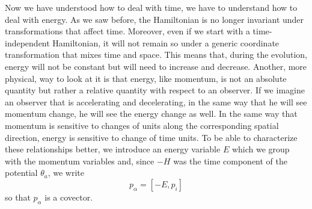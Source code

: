 Now we have understood how to deal with time, we have to understand how to deal with energy. As we saw before, the Hamiltonian is no longer invariant under transformations that affect time. Moreover, even if we start with a time-independent Hamiltonian, it will not remain so under a generic coordinate transformation that mixes time and space. This means that, during the evolution, energy will not be constant but will need to increase and decrease. Another, more physical, way to look at it is that energy, like momentum, is not an absolute quantity but rather a relative quantity with respect to an observer. If we imagine an observer that is accelerating and decelerating, in the same way that he will see momentum change, he will see the energy change as well. In the same way that momentum is sensitive to changes of units along the corresponding spatial direction, energy is sensitive to change of time units. To be able to characterize these relationships better, we introduce an energy variable $E$ which we group with the momentum variables and, since $-H$ was the time component of the potential $\theta_a$, we write
\begin{equation}
	p_\alpha = [-E, p_i]
\end{equation}
so that $p_\alpha$ is a covector.

